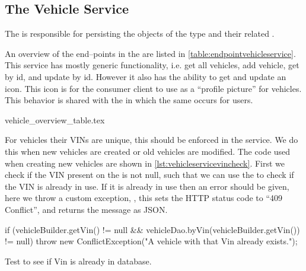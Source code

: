 \subsection{The Vehicle Service}\label{subsec:vehicleservice}

The  is responsible for persisting the objects of the type  and their related .

An overview of the end--points in the  are listed in \cref{table:endpointvehicleservice}.
This service has mostly generic functionality, i.e. get all vehicles, add vehicle, get by id, and update by id.
However it also has the ability to get and update an icon.
This icon is for the consumer client to use as a ``profile picture'' for vehicles.
This behavior is shared with the  in which the same occurs for users.

{vehicle_overview_table.tex}

For vehicles their \acp{VIN} are unique, this should be enforced in the service.
We do this when new vehicles are created or old vehicles are modified.
The code used when creating new vehicles are shown in \cref{lst:vehicleservicevincheck}.
First we check if the \ac{VIN} present on the  is not null,
such that we can use the  to check if the \ac{VIN} is already in use.
If it is already in use then an error should be given, here we throw a custom exception,
, this sets the HTTP status code to ``409 Conflict'', and returns the message as JSON.

\begin{listing}
    \begin{java2}
if (vehicleBuilder.getVin() != null && vehicleDao.byVin(vehicleBuilder.getVin()) != null) {
    throw new ConflictException("A vehicle with that Vin already exists.");
}
    \end{java2}
    \caption{Test to see if Vin is already in database.}\label{lst:vehicleservicevincheck}
\end{listing}

